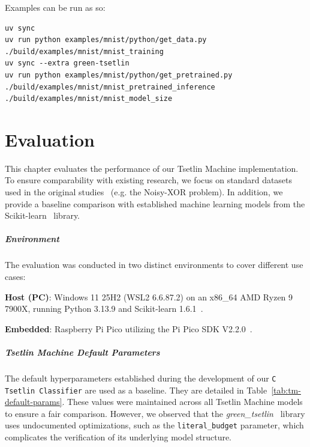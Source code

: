 \documentclass[english]{aghengthesis} %
\newcommand*{\GreenTsetlinName}{\emph{green\_tsetlin}~\cite{glimsdal2024greentsetlin} }
\begin{document}
Examples can be run as so:  
\begin{lstlisting}[style=cli]
uv sync
uv run python examples/mnist/python/get_data.py
./build/examples/mnist/mnist_training
uv sync --extra green-tsetlin
uv run python examples/mnist/python/get_pretrained.py
./build/examples/mnist/mnist_pretrained_inference
./build/examples/mnist/mnist_model_size
\end{lstlisting}


\chapter{Evaluation}
\label{chap:evaluation}
This chapter evaluates the performance of our Tsetlin Machine implementation. To ensure comparability with existing research, we focus on standard datasets used in the original studies~\cite{granmo2021tsetlinmachinegame} (e.g. the Noisy-XOR problem). In addition, we provide a baseline comparison with established machine learning models from the Scikit-learn~\cite{scikit-learn} library.

\paragraph{Environment}
The evaluation was conducted in two distinct environments to cover different use cases:
\begin{compactitem}
    \item \textbf{Host (PC)}: Windows 11 25H2 (WSL2 6.6.87.2) on an x86\_64 AMD Ryzen 9 7900X, running Python 3.13.9 and Scikit-learn 1.6.1~\cite{scikit-learn}.
    \item \textbf{Embedded}: Raspberry Pi Pico utilizing the Pi Pico SDK V2.2.0~\cite{pico-sdk}.
\end{compactitem}

\paragraph{Tsetlin Machine Default Parameters}
The default hyperparameters established during the development of our \texttt{C Tsetlin Classifier} are used as a baseline. They are detailed in Table~\ref{tab:tm-default-params}. These values were maintained across all Tsetlin Machine models to ensure a fair comparison. However, we observed that the \GreenTsetlinName library uses undocumented optimizations, such as the \texttt{literal\_budget} parameter, which complicates the verification of its underlying model structure.
\end{document}
